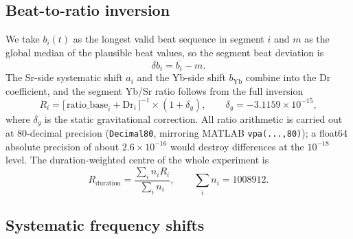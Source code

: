\documentclass[11pt,a4paper]{article}
\newcommand{\Rdur}{R_{\mathrm{duration}}}
\newcommand{\e}[1]{\times 10^{#1}}
\begin{document}


\subsection{Beat-to-ratio inversion}
\label{app:methods-ratio}
We take $b_i(t)$ as the longest valid beat sequence in segment $i$ and
$m$ as the global median of the plausible beat values, so the segment beat
deviation is
\begin{equation}
  \overline{\delta b}_i = \overline{b_i} - m .
\end{equation}
The Sr-side systematic shift $a_i$ and the Yb-side shift $b_{\mathrm{Yb}}$
combine into the Dr coefficient, and the segment Yb/Sr ratio follows from
the full inversion
\begin{equation}
  R_i = \bigl[\,\mathrm{ratio\_base}_i + \mathrm{Dr}_i\,\bigr]^{-1}
        \times (1+\delta_g),
  \qquad \delta_g = -3.1159\e{-15},
  \label{eq:ratio}
\end{equation}
where $\delta_g$ is the static gravitational correction. All ratio
arithmetic is carried out at 80-decimal precision (\texttt{Decimal80},
mirroring MATLAB \texttt{vpa(...,80)}); a float64 absolute precision of
about $2.6\e{-16}$ would destroy differences at the $10^{-18}$ level. The
duration-weighted centre of the whole experiment is
\begin{equation}
  \Rdur = \frac{\sum_i n_i R_i}{\sum_i n_i},
  \qquad \sum_i n_i = \num{1008912}.
  \label{eq:rduration}
\end{equation}


\subsection{Systematic frequency shifts}
\label{app:systematics}
\end{document}
